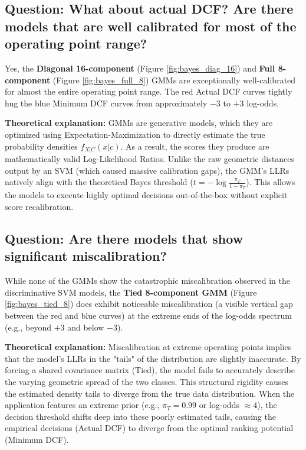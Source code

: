 \subsection*{Question: What about actual DCF? Are there models that are well calibrated for most of the operating point range?}

Yes, the \textbf{Diagonal 16-component} (Figure \ref{fig:bayes_diag_16}) and \textbf{Full 8-component} (Figure \ref{fig:bayes_full_8}) GMMs are exceptionally well-calibrated for almost the entire operating point range. The red Actual DCF curves tightly hug the blue Minimum DCF curves from approximately $-3$ to $+3$ log-odds.

\textbf{Theoretical explanation:} GMMs are generative models, which they are optimized using Expectation-Maximization to directly estimate the true probability densities $f_{X|C}(x|c)$. As a result, the scores they produce are mathematically valid Log-Likelihood Ratios. Unlike the raw geometric distances output by an SVM (which caused massive calibration gaps), the GMM's LLRs natively align with the theoretical Bayes threshold ($t = -\log \frac{\pi_T}{1-\pi_T}$). This allows the models to execute highly optimal decisions out-of-the-box without explicit score recalibration.

\subsection*{Question: Are there models that show significant miscalibration?}

While none of the GMMs show the catastrophic miscalibration observed in the discriminative SVM models, the \textbf{Tied 8-component GMM} (Figure \ref{fig:bayes_tied_8}) does exhibit noticeable miscalibration (a visible vertical gap between the red and blue curves) at the extreme ends of the log-odds spectrum (e.g., beyond $+3$ and below $-3$). 

\textbf{Theoretical explanation:} Miscalibration at extreme operating points implies that the model's LLRs in the "tails" of the distribution are slightly inaccurate. By forcing a shared covariance matrix (Tied), the model fails to accurately describe the varying geometric spread of the two classes. This structural rigidity causes the estimated density tails to diverge from the true data distribution. When the application features an extreme prior (e.g., $\pi_T = 0.99$ or log-odds $\approx 4$), the decision threshold shifts deep into these poorly estimated tails, causing the empirical decisions (Actual DCF) to diverge from the optimal ranking potential (Minimum DCF).

